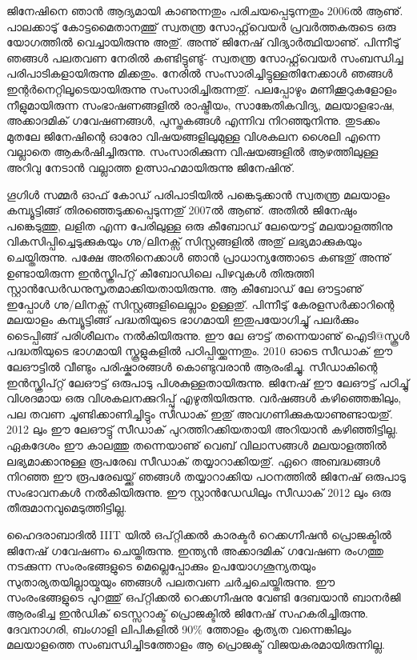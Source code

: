 \newpage
{}
 
ജിനേഷിനെ ഞാന്‍ ആദ്യമായി കാണുന്നതും പരിചയപ്പെടുന്നതും 2006ല്‍ ആണു്. പാലക്കാടു് കോട്ടമൈതാനത്തു് സ്വതന്ത്ര സോഫ്റ്റ്‌‌വെയര്‍ പ്രവര്‍ത്തകരുടെ ഒരു യോഗത്തില്‍ വെച്ചായിരുന്നു അതു്. അന്നു് ജിനേഷ് വിദ്യാര്‍ത്ഥിയാണു്. പിന്നീടു് ഞങ്ങള്‍ പലതവണ നേരില്‍ കണ്ടിട്ടുണ്ടു്- സ്വതന്ത്ര സോഫ്റ്റ്‌വെയര്‍ സംബന്ധിച്ച പരിപാടികളായിരുന്നു മിക്കതും. നേരില്‍ സംസാരിച്ചിട്ടുള്ളതിനേക്കാള്‍ ഞങ്ങള്‍ ഇന്റര്‍നെറ്റിലൂടെയായിരുന്നു സംസാരിച്ചിരുന്നതു്. പലപ്പോഴും മണിക്കൂറുകളോളം നീളുമായിരുന്ന സംഭാഷണങ്ങളില്‍ രാഷ്ട്രീയം, സാങ്കേതികവിദ്യ, മലയാളഭാഷ, അക്കാദമിക് ഗവേഷണങ്ങള്‍, പുസ്തകങ്ങള്‍ എന്നിവ നിറഞ്ഞുനിന്നു. തുടക്കം മുതലേ ജിനേഷിന്റെ ഓരോ വിഷയങ്ങളിലുമുള്ള വിശകലന ശൈലി എന്നെ വല്ലാതെ ആകര്‍ഷിച്ചിരുന്നു. സംസാരിക്കുന്ന വിഷയങ്ങളില്‍ ആഴത്തിലുള്ള അറിവു നേടാന്‍ വല്ലാത്ത ഉത്സാഹമായിരുന്നു ജിനേഷിനു്.
 
ഗൂഗിള്‍ സമ്മര്‍ ഓഫ് കോഡ് പരിപാടിയില്‍ പങ്കെടുക്കാന്‍ സ്വതന്ത്ര മലയാളം കമ്പ്യൂട്ടിങ്ങ് തിരഞ്ഞെടുക്കപ്പെടുന്നതു് 2007ല്‍ ആണു്. അതില്‍ ജിനേഷും പങ്കെടുത്തു, ലളിത എന്ന പേരിലുള്ള ഒരു കീബോഡ് ലേയൌട്ട്  മലയാളത്തിനു വികസിപ്പിച്ചെടുക്കുകയും  ഗ്നു/ലിനക്സ് സിസ്റ്റങ്ങളില്‍ അതു് ലഭ്യമാക്കുകയും ചെയ്തിരുന്നു. പക്ഷേ അതിനെക്കാള്‍ ഞാന്‍ പ്രാധാന്യത്തോടെ കണ്ടതു് അന്നു് ഉണ്ടായിരുന്ന ഇന്‍സ്ക്രിപ്റ്റ് കീബോഡിലെ പിഴവുകള്‍ തിരുത്തി സ്റ്റാന്‍ഡേര്‍ഡനുസൃതമാക്കിയതായിരുന്നു. ആ കീബോഡ് ലേ ഔട്ടാണു്  ഇപ്പോള്‍ ഗ്നു/ലിനക്സ് സിസ്റ്റങ്ങളിലെല്ലാം ഉള്ളതു്. പിന്നീടു് കേരളസര്‍ക്കാറിന്റെ മലയാളം കമ്പ്യൂട്ടിങ്ങ് പദ്ധതിയുടെ ഭാഗമായി ഇതുപയോഗിച്ചു് പലര്‍ക്കും ടൈപ്പിങ്ങ് പരിശീലനം നല്‍കിയിരുന്നു. ഈ ലേ ഔട്ട് തന്നെയാണു് ഐടി@സ്കൂള്‍ പദ്ധതിയുടെ ഭാഗമായി സ്കൂളുകളില്‍ പഠിപ്പിയ്ക്കുന്നതും. 2010 ഓടെ സീഡാക്‍ ഈ ലേഔട്ടില്‍ വീണ്ടും പരിഷ്കാരങ്ങള്‍ കൊണ്ടുവരാന്‍ ആരംഭിച്ചു. സീഡാകിന്റെ ഇന്‍സ്ക്രിപ്റ്റ് ലേഔട്ട് ഒരുപാടു പിശകുള്ളതായിരുന്നു. ജിനേഷ് ഈ ലേഔട്ട് പഠിച്ചു് വിശദമായ ഒരു വിശകലനക്കുറിപ്പു് എഴുതിയിരുന്നു. വര്‍ഷങ്ങള്‍ കഴിഞ്ഞെങ്കിലും, പല തവണ ചൂണ്ടിക്കാണിച്ചിട്ടും സീഡാക്‍ ഇതു് അവഗണിക്കുകയാണുണ്ടായതു്. 2012 ലും ഈ ലേഔട്ടു് സീഡാക്‍ പുറത്തിറക്കിയതായി അറിയാന്‍ കഴിഞ്ഞിട്ടില്ല. ഏകദേശം ഈ കാലത്തു തന്നെയാണു് വെബ് വിലാസങ്ങള്‍ മലയാളത്തില്‍ ലഭ്യമാക്കാനുള്ള രൂപരേഖ സീഡാക്‍ തയ്യാറാക്കിയതു്. ഏറെ അബദ്ധങ്ങള്‍ നിറഞ്ഞ ഈ രൂപരേഖയ്ക്കു് ഞങ്ങള്‍ തയ്യാറാക്കിയ പഠനത്തില്‍ ജിനേഷ് ഒരുപാടു സംഭാവനകള്‍ നല്‍കിയിരുന്നു. ഈ സ്റ്റാന്‍ഡേഡിലും സീഡാക്‍ 2012 ലും ഒരു തീരുമാനവുമെടുത്തിട്ടില്ല.
 
ഹൈദരാബാദില്‍ IIIT യില്‍ ഒപ്റ്റിക്കല്‍ കാരക്ടര്‍ റെക്കഗ്നീഷന്‍ പ്രൊജക്ടില്‍ ജിനേഷ് ഗവേഷണം ചെയ്തിരുന്നു. ഇന്ത്യന്‍ അക്കാദമിക് ഗവേഷണ രംഗത്തു നടക്കുന്ന സംരംഭങ്ങളുടെ മെല്ലെപ്പോക്കും ഉപയോഗശൂന്യതയും സുതാര്യതയില്ലായ്മയും ഞങ്ങള്‍ പലതവണ ചര്‍ച്ചചെയ്തിരുന്നു. ഈ സംരംഭങ്ങളുടെ പുറത്തു് ഒപ്റ്റിക്കല്‍ റെക്കഗ്നീഷനു വേണ്ടി ദേബയാന്‍ ബാനര്‍ജി ആരംഭിച്ച ഇന്‍ഡിക് ടെസ്സറാക്ട് പ്രൊജക്ടില്‍ ജിനേഷ് സഹകരിച്ചിരുന്നു. ദേവനാഗരി, ബംഗാളി ലിപികളില്‍ 90\% ത്തോളം കൃത്യത വന്നെങ്കിലും മലയാളത്തെ സംബന്ധിച്ചിടത്തോളം ആ പ്രൊജക്ട് വിജയകരമായിരുന്നില്ല.
 
